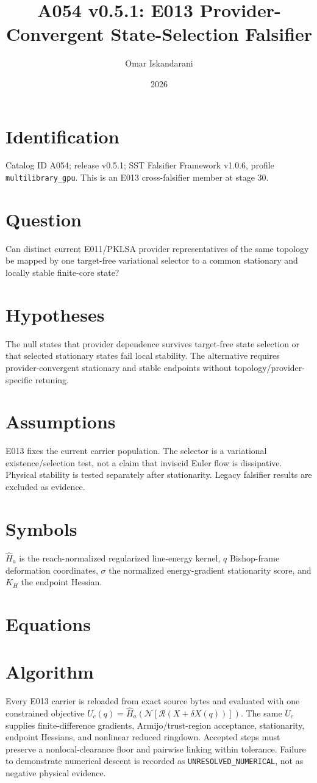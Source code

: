 \documentclass[11pt]{article}
\title{A054 v0.5.1: E013 Provider-Convergent State-Selection Falsifier}
\author{Omar Iskandarani}
\date{2026}
\begin{document}
\maketitle
\section{Identification}
Catalog ID A054; release v0.5.1; SST Falsifier Framework v1.0.6, profile \texttt{multilibrary\_gpu}. This is an E013 cross-falsifier member at stage 30.
\section{Question}
Can distinct current E011/PKLSA provider representatives of the same topology be mapped by one target-free variational selector to a common stationary and locally stable finite-core state?
\section{Hypotheses}
The null states that provider dependence survives target-free state selection or that selected stationary states fail local stability. The alternative requires provider-convergent stationary and stable endpoints without topology/provider-specific retuning.
\section{Assumptions}
E013 fixes the current carrier population. The selector is a variational existence/selection test, not a claim that inviscid Euler flow is dissipative. Physical stability is tested separately after stationarity. Legacy falsifier results are excluded as evidence.
\section{Symbols}
$\widehat H_a$ is the reach-normalized regularized line-energy kernel, $q$ Bishop-frame deformation coordinates, $\sigma$ the normalized energy-gradient stationarity score, and $K_H$ the endpoint Hessian.
\section{Equations}

\section{Algorithm}
Every E013 carrier is reloaded from exact source bytes and evaluated with one constrained objective $U_c(q)=\widehat H_a(\mathcal N[\mathcal R(X+\delta X(q))])$. The same $U_c$ supplies finite-difference gradients, Armijo/trust-region acceptance, stationarity, endpoint Hessians, and nonlinear reduced ringdown. Accepted steps must preserve a nonlocal-clearance floor and pairwise linking within tolerance. Failure to demonstrate numerical descent is recorded as \texttt{UNRESOLVED\_NUMERICAL}, not as negative physical evidence.
\end{document}
